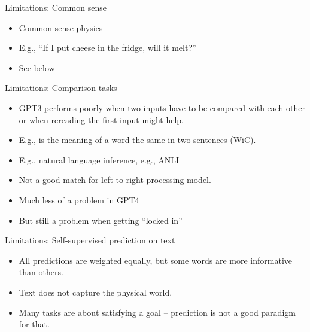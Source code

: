 
\begin{frame}{Limitations: Common sense}

\vfill

  \begin{itemize}
\item Common sense physics
\item E.g., ``If I put cheese in the fridge, will it melt?''
\item See below
    \end{itemize}

\vfill

\end{frame}


\begin{frame}{Limitations: Comparison tasks}

\vfill
			
  \begin{itemize}
\item GPT3 performs poorly when two inputs have to be
compared with each other or when rereading the first input
might help.
\item E.g., is the meaning of a word the same in two
sentences (WiC).
\item E.g., natural language inference, e.g., ANLI
\item Not a good match for left-to-right processing model.
\item Much less of a problem in GPT4
\item But still a problem when getting ``locked in'' 
    \end{itemize}

\vfill

\end{frame}


\begin{frame}{Limitations: Self-supervised prediction on text}

\vfill

  \begin{itemize}
\item All predictions are weighted equally, but some
words are more informative than others.
    \item Text does not capture the physical world.
\item Many tasks are about satisfying a goal --
prediction is not a good paradigm for that.
    \end{itemize}

\vfill

\end{frame}

